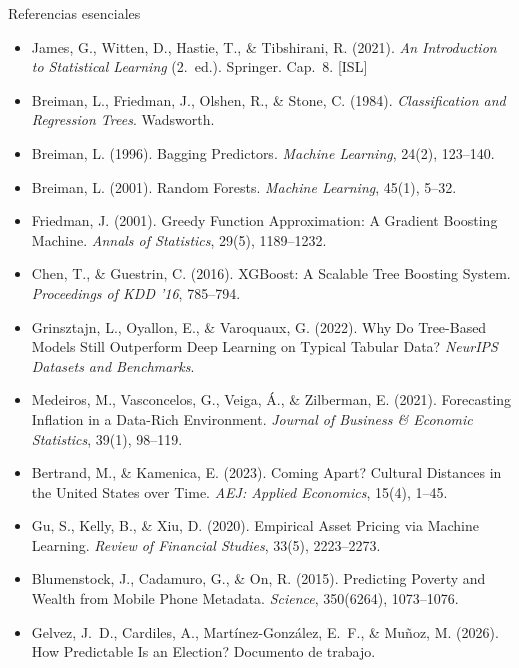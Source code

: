 \documentclass{beamer}
\newcommand{\1}{\mathbb{I}}
\begin{document}
\begin{frame}{Referencias esenciales}
\scriptsize
\begin{itemize}\itemsep1pt
  \item James, G., Witten, D., Hastie, T., \& Tibshirani, R. (2021). \emph{An Introduction to Statistical Learning} (2.\ ed.). Springer. Cap.\ 8. [ISL]
  \item Breiman, L., Friedman, J., Olshen, R., \& Stone, C. (1984). \emph{Classification and Regression Trees}. Wadsworth.
  \item Breiman, L. (1996). Bagging Predictors. \emph{Machine Learning}, 24(2), 123--140.
  \item Breiman, L. (2001). Random Forests. \emph{Machine Learning}, 45(1), 5--32.
  \item Friedman, J. (2001). Greedy Function Approximation: A Gradient Boosting Machine. \emph{Annals of Statistics}, 29(5), 1189--1232.
  \item Chen, T., \& Guestrin, C. (2016). XGBoost: A Scalable Tree Boosting System. \emph{Proceedings of KDD '16}, 785--794.
  \item Grinsztajn, L., Oyallon, E., \& Varoquaux, G. (2022). Why Do Tree-Based Models Still Outperform Deep Learning on Typical Tabular Data? \emph{NeurIPS Datasets and Benchmarks}.
  \item Medeiros, M., Vasconcelos, G., Veiga, Á., \& Zilberman, E. (2021). Forecasting Inflation in a Data-Rich Environment. \emph{Journal of Business \& Economic Statistics}, 39(1), 98--119.
  \item Bertrand, M., \& Kamenica, E. (2023). Coming Apart? Cultural Distances in the United States over Time. \emph{AEJ: Applied Economics}, 15(4), 1--45.
  \item Gu, S., Kelly, B., \& Xiu, D. (2020). Empirical Asset Pricing via Machine Learning. \emph{Review of Financial Studies}, 33(5), 2223--2273.
  \item Blumenstock, J., Cadamuro, G., \& On, R. (2015). Predicting Poverty and Wealth from Mobile Phone Metadata. \emph{Science}, 350(6264), 1073--1076.
  \item Gelvez, J.\ D., Cardiles, A., Martínez-González, E.\ F., \& Muñoz, M. (2026). How Predictable Is an Election? Documento de trabajo.
\end{itemize}
\normalsize
\end{frame}


\appendix
\end{document}
